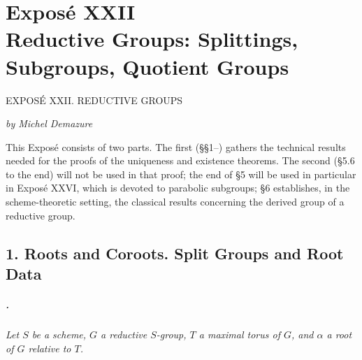 
\chapter*{Exposé XXII\\
Reductive Groups: Splittings, Subgroups, Quotient Groups}
  {EXPOSÉ XXII. REDUCTIVE GROUPS}

\begin{center}
  \textit{by Michel Demazure}
\end{center}

This Exposé consists of two parts. The first (\S\S1--) gathers the
technical results needed for the proofs of the uniqueness and
existence theorems. The second (\S5.6 to the end) will not be used in
that proof; the end of \S5 will be used in particular in Exposé XXVI,
which is devoted to parabolic subgroups; \S6 establishes, in the
scheme-theoretic setting, the classical results concerning the
derived group of a reductive group.

\section*{1. Roots and Coroots.
Split Groups and Root Data}

\paragraph{.}
\textit{Let \(S\) be a scheme, \(G\) a reductive \(S\)-group,
\(T\) a maximal torus of \(G\), and \(\alpha\) a root of \(G\)
relative to \(T\).}


